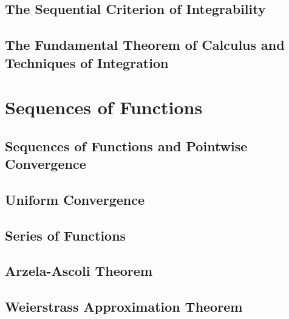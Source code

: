 \documentclass[a4paper, openany]{book}
\begin{document}
\section{The Sequential Criterion of Integrability}

\newpage

\section{The Fundamental Theorem of Calculus and Techniques of Integration}

\newpage

\chapter{Sequences of Functions}
\section{Sequences of Functions and Pointwise Convergence}

\newpage

\section{Uniform Convergence}

\newpage

\section{Series of Functions}

\newpage

\section{Arzela-Ascoli Theorem}

\newpage

\section{Weierstrass Approximation Theorem}

\newpage
\end{document}
